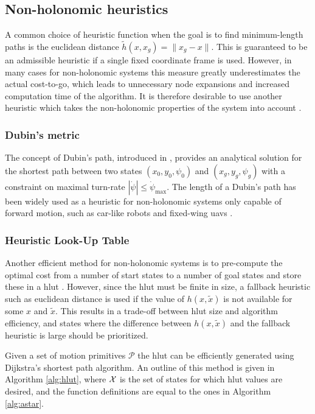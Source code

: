 \subsection{Non-holonomic heuristics}
A common choice of heuristic function when the goal is to find minimum-length paths is the euclidean distance $\tilde{h}(x, x_g)=\|x_g-x\|$. This is guaranteed to be an admissible heuristic if a single fixed coordinate frame is used. However, in many cases for
non-holonomic systems this measure greatly underestimates the actual cost-to-go, which leads to unnecessary node expansions and 
increased computation time of the algorithm. It is therefore desirable to use another heuristic which takes the non-holonomic properties 
of the system into account \cite{state_lattice_planning}.

\subsubsection{Dubin's metric}
The concept of Dubin's path, introduced in \cite{dubins}, provides an analytical solution for the
shortest path between two states $(x_0,y_0,\psi_0)$ and $(x_g,y_g,\psi_g)$ with a constraint on maximal turn-rate $|\dot{\psi}|\leq\dot{\psi}_{\text{max}}$.
The length of a Dubin's path has been widely used as a heuristic for non-holonomic systems only capable of forward motion, such as car-like robots and fixed-wing \acp{uav} \cite{2_phase_uav}.

\subsubsection{Heuristic Look-Up Table}\label{sec:hlut}
Another efficient method for non-holonomic systems is to pre-compute the optimal cost from a number of start states to 
a number of goal states and store these in a \ac{hlut} \cite{hlut}. However, since the \ac{hlut} 
must be finite in size, a fallback heuristic such as euclidean distance is used if the value of $h(x,\tilde{x})$ is not available for some $x$ and $\tilde{x}$.
This results in a trade-off between \ac{hlut} size and algorithm efficiency, and states where the difference between $h(x,\tilde{x})$ and the fallback heuristic 
is large should be prioritized.

Given a set of motion primitives $\mathcal{P}$ the \ac{hlut} can be efficiently generated using Dijkstra's shortest path algorithm. 
An outline of this method is given in Algorithm \ref{alg:hlut}, where $\mathcal{X}$ is the set of states for which \ac{hlut} values are desired, and the function definitions 
are equal to the ones in Algorithm \ref{alg:astar}.

